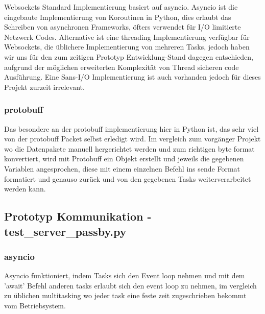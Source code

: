 Websockets Standard Implementierung basiert auf asyncio.
%  
Asyncio ist die eingebaute Implementierung von Koroutinen in Python,
dies erlaubt das Schreiben von asynchronen Frameworks, 
öfters verwendet für I/O limitierte Netzwerk Codes.
Alternative ist eine threading Implementierung verfügbar für Websockets, 
die üblichere Implementierung von mehreren Tasks, 
jedoch haben wir uns für den zum zeitigen Prototyp Entwicklung-Stand dagegen entschieden,
aufgrund der möglichen erweiterten Komplexität von Thread sicheren code Ausführung.
Eine Sans-I/O Implementierung ist auch vorhanden jedoch für dieses Projekt zurzeit irrelevant.

\subsubsection{protobuff}
Das besondere an der protobuff implementierung hier in Python ist,
das sehr viel von der protobuff Packet selbst erledigt wird.
Im vergleich zum vorgänger Projekt wo die Datenpakete manuell hergerichtet werden
und zum richtigen byte format konvertiert, wird mit Protobuff ein Objekt erstellt 
und jeweils die gegebenen Variablen angesprochen, 
diese mit einem einzelnen Befehl ins sende Format formatiert und genauso zurück
und von den gegebenen Tasks weiterverarbeitet werden kann.


\subsection{Prototyp Kommunikation - test\_server\_passby.py}



\subsubsection{asyncio}
Asyncio funktioniert, indem Tasks sich den Event loop nehmen und mit dem 'await' 
Befehl anderen tasks erlaubt sich den event loop zu nehmen, im vergleich zu üblichen multitasking
wo jeder task eine feste zeit zugeschrieben bekommt vom Betriebsystem.

